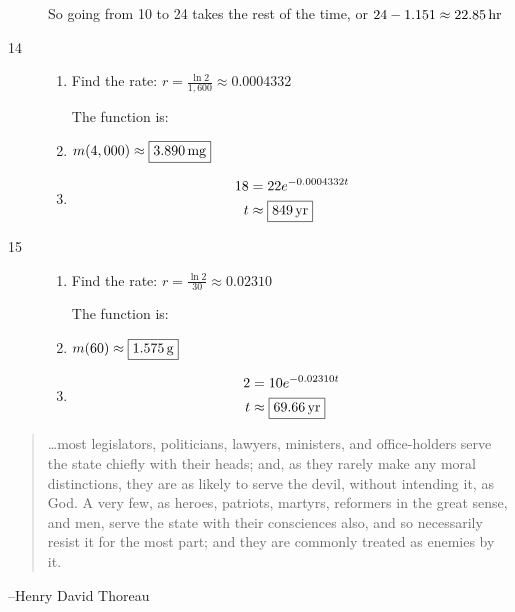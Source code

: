 \documentclass{exam}
\begin{document}
\begin{description}
        So going from 10 to 24 takes the rest of the time, or $24 - 1.151 \approx \unit[22.85]{hr} $

      \item[14] 
        \begin{enumerate}[a]
          \item Find the rate: $r = \frac{\ln 2}{1,600} \approx 0.0004332$

            The function is: 

          \item $m(4,000) \approx \boxed{\unit[3.890]{mg}}$

          \item
            \begin{align*}
              18 & = 22 e^{-0.0004332 t} \\
              t  & \approx \boxed{\unit[849]{yr}} \\
            \end{align*}

        \end{enumerate}

      \item[15] 
        \begin{enumerate}[a]
          \item Find the rate: $r = \frac{\ln 2}{30} \approx 0.02310$

            The function is: 

          \item $m(60) \approx \boxed{\unit[1.575]{g}}$

          \item
            \begin{align*}
              2 & = 10 e^{-0.02310 t} \\
              t  & \approx \boxed{\unit[69.66]{yr}} \\
            \end{align*}

        \end{enumerate}

    \end{description}

  \else
    \vspace{1 cm}
    \begin{quote}
      \begin{em}
        \ldots most legislators, politicians, lawyers, ministers, and office-holders serve the state chiefly with their
        heads; and, as they rarely make any moral distinctions, they are as likely to serve the devil, without intending
        it, as God. A very few, as heroes, patriots, martyrs, reformers in the great sense, and men, serve the state with
        their consciences also, and so necessarily resist it for the most part; and they are commonly treated as enemies
        by it.      
      \end{em}
    \end{quote}
    \hspace{1 cm} --Henry David Thoreau
  \fi
\end{document}
